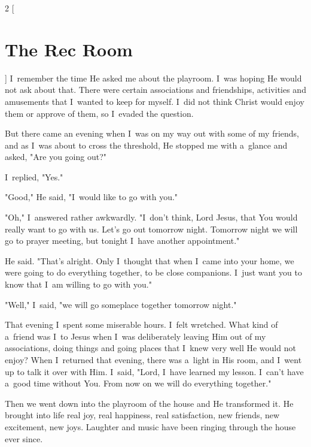 \documentclass[a4paper,12pt]{article}
\begin{document}
\begin{multicols}{2}
    [
\section*{The Rec Room}
    ]
I~remember the time He asked me about the playroom. I~was hoping He would not ask about that. There were certain associations and friendships, activities and amusements that I~wanted to keep for myself. I~did not think Christ would enjoy them or approve of them, so I~evaded the question. 

But there came an evening when I~was on my way out with some of my friends, and as I~was about to cross the threshold, He stopped me with a~glance and asked, "Are you going out?" 

I~replied, "Yes." 

"Good," He said, "I~would like to go with you." 

"Oh," I~answered rather awkwardly. "I~don't think, Lord Jesus, that You would really want to go with us. Let's go out tomorrow night. Tomorrow night we will go to prayer meeting, but tonight I~have another appointment." 

He said. "That's alright. Only I~thought that when I~came into your home, we were going to do everything together, to be close companions. I~just want you to know that I~am willing to go with you." 

"Well," I~said, "we will go someplace together tomorrow night." 

That evening I~spent some miserable hours. I~felt wretched. What kind of a~friend was I~to Jesus when I~was deliberately leaving Him out of my associations, doing things and going places that I~knew very well He would not enjoy? When I~returned that evening, there was a~light in His room, 
and I~went up to talk it over with Him. I~said, "Lord, I~have learned my lesson. I~can't have a~good time without You. From now on we will do everything together." 

Then we went down into the playroom of the house and He transformed it. He brought into life real joy, real happiness, real satisfaction, new friends, new excitement, new joys. Laughter and music have been ringing through the house ever since. 
\end{multicols}
\end{document}
